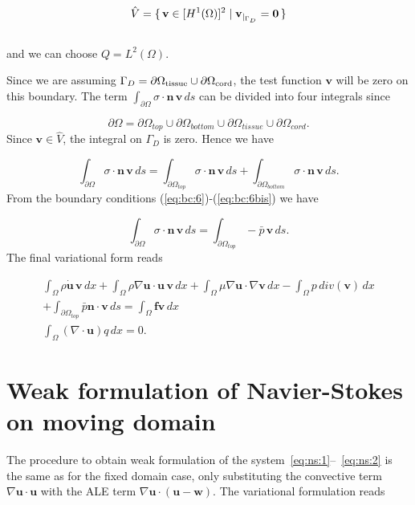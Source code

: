 \documentclass[a4paper,11pt,oneside]{book}
\begin{document}
\begin{equation}
\hat{V} = \set{\mathbf{v} \in [H^1(\Omega)]^2 | \mathbf{v}_{|_{\Gamma_D}} = \mathbf{0}} 
\end{equation}
\\
and we can choose $Q = L^2(\Omega)$. 

Since we are assuming $\Gamma_D = \partial  \Omega_{\rm tissue} \cup  \partial \Omega_{\rm cord}$, the test function $\mathbf{v}$ will be zero on this boundary. The term $\int_{\partial \Omega} \sigma \cdot \mathbf{n} \,  \mathbf{v} \, ds$ can be divided into four integrals since

\begin{equation}
\partial \Omega = \partial \Omega_{top} \cup \partial \Omega_{bottom} \cup \partial \Omega_{tissue} \cup \partial \Omega_{cord}.
\end{equation}
Since $\mathbf{v} \in \hat{V}$, the integral on $\Gamma_D$ is zero. Hence we have

\begin{equation}
\int_{\partial \Omega}  \sigma \cdot \mathbf{n} \, \mathbf{v} \, ds
= \int_{\partial \Omega_{top}}   \sigma \cdot \mathbf{n} \, \mathbf{v} \, ds
+ \int_{\partial \Omega_{bottom}}  \sigma \cdot \mathbf{n} \, \mathbf{v} \, ds.
\end{equation}
From the boundary conditions (\ref{eq:bc:6})-(\ref{eq:bc:6bis}) we have

\begin{equation}
\int_{\partial \Omega}  \sigma \cdot \mathbf{n} \, \mathbf{v} \, ds
= \int_{\partial \Omega_{top}}  - \bar{p} \, \mathbf{v} \, ds.
\end{equation}
The final variational form reads

\begin{equation}
\label{eq:ns:4}
\begin{split}
\int_{\Omega} \rho \dot{\mathbf{u}} \, \mathbf{v} \, dx
+ \int_{\Omega} \rho \nabla \mathbf{u} \cdot \mathbf{u} \, \mathbf{v} \, dx
+ \int_{\Omega} \mu \nabla \mathbf{u} \cdot \nabla \mathbf{v} \, dx 
- \int_{\Omega} p \, div(\mathbf{v}) \, dx \\
+ \int_{\partial \Omega_{top}} \bar{p} \mathbf{n} \cdot \mathbf{v} \, ds
 =  \int_{\Omega} \mathbf{f} \mathbf{v} \, dx \\
\int_{\Omega}  (\nabla \cdot \mathbf{u}) q \, dx = 0.
\end{split}
\end{equation}


\section{Weak formulation of Navier-Stokes on moving domain}
The procedure to obtain weak formulation of the system~\eqref{eq:ns:1}--~\eqref{eq:ns:2} is the same as for the fixed domain case, only substituting the convective term $\nabla \mathbf{u} \cdot \mathbf{u}$ with the ALE term $\nabla \mathbf{u} \cdot \mathbf{(u - w)}$. The variational formulation reads
\end{document}

